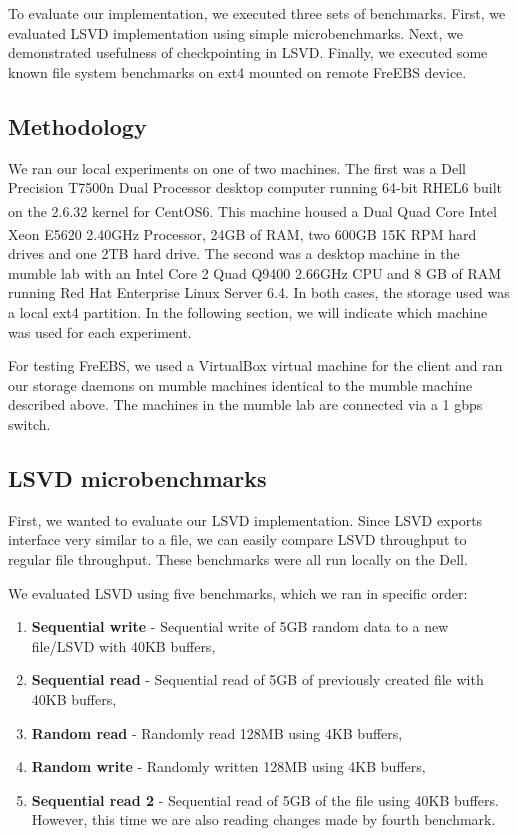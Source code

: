 To evaluate our implementation, we executed three sets of benchmarks. First, we evaluated LSVD implementation using simple microbenchmarks. Next, we demonstrated usefulness of checkpointing in LSVD. Finally, we executed some known file system benchmarks on ext4 mounted on remote FreEBS device.

\subsection{Methodology}
We ran our local experiments on one of two machines. The first was a Dell Precision T7500n Dual Processor desktop 
computer running 64-bit RHEL6 built on the 2.6.32 kernel for CentOS6. This 
machine housed a Dual Quad Core Intel\textsuperscript{\textregistered} 
Xeon\textsuperscript{\textregistered} E5620 2.40GHz Processor, 24GB of RAM, 
two 600GB 15K RPM hard drives and one 2TB hard drive. The second was a desktop machine in the mumble lab with an Intel Core 2 Quad Q9400 2.66GHz CPU and 8 GB of RAM running Red Hat Enterprise Linux Server 6.4. In both cases, the storage used was a local ext4 partition. In the following section, we will indicate which machine was used for each experiment.

For testing FreEBS, we used a VirtualBox virtual machine for the client and ran our storage daemons on mumble machines identical to the mumble machine described above. The machines in the mumble lab are connected via a 1 gbps switch.

\subsection{LSVD microbenchmarks}
First, we wanted to evaluate our LSVD implementation. Since LSVD exports interface very similar to a file, we can easily compare LSVD throughput to regular file throughput. These benchmarks were all run locally on the Dell.

We evaluated LSVD using five benchmarks, which we ran in specific order:
\begin{enumerate}
\item \textbf{Sequential write} - Sequential write of 5GB random data to a new file/LSVD with 40KB buffers,
\item \textbf{Sequential read} - Sequential read of 5GB of previously created file with 40KB buffers,
\item \textbf{Random read} - Randomly read 128MB using 4KB buffers,
\item \textbf{Random write} - Randomly written 128MB using 4KB buffers,
\item \textbf{Sequential read 2} - Sequential read of 5GB of the file using 40KB buffers. However, this time we are also reading changes made by fourth benchmark.
\end{enumerate}

